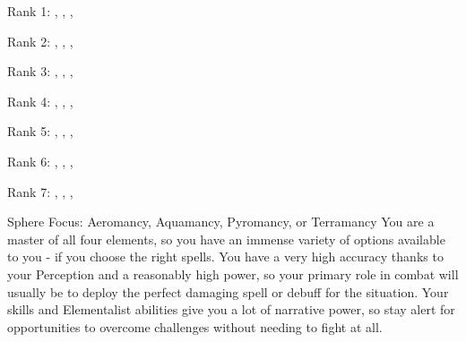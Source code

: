            \begin{raggeditemize}
                \RaggedRight
                \item Rank 1: , , , 
                \item Rank 2: , , , 
                \item Rank 3: , , , 
                \item Rank 4: , , , 
                \item Rank 5: , , , 
                \item Rank 6: , , , 
                \item Rank 7: , , , 
            \end{raggeditemize}
             Sphere Focus: Aeromancy, Aquamancy, Pyromancy, or Terramancy
             You are a master of all four elements, so you have an immense variety of options available to you - if you choose the right spells.
            You have a very high accuracy thanks to your Perception and a reasonably high power, so your primary role in combat will usually be to deploy the perfect damaging spell or debuff for the situation.
            Your skills and Elementalist abilities give you a lot of narrative power, so stay alert for opportunities to overcome challenges without needing to fight at all.

